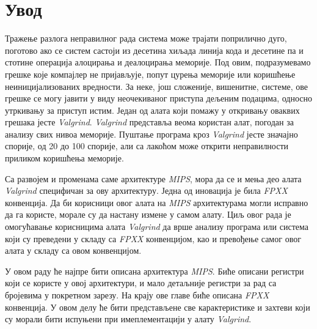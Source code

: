 \documentclass[12pt,oneside]{memoir}
\begin{document}
\frontmatter
\naslovna
\komisija
\apstrakt
\tableofcontents*

\mainmatter

\chapter{Увод}

\indent Тражење разлога неправилног рада система може трајати поприлично дуго, поготово ако се систем састоји из десетина хиљада линија кода и десетине па и стотине операција алоцирања и деалоцирања меморије. Под овим, подразумевамо грешке које компајлер не пријављује, попут цурења меморије или коришћење неиницијализованих вредности. За неке, још сложеније, вишенитне, системе, ове грешке се могу јавити у виду неочекиваног приступа дељеним подацима, односно утркивању за приступ истим. Један од алата који помажу у откривању оваквих грешака јесте \textit{Valgrind}. \textit{Valgrind} представља веома користан алат, погодан за анализу свих нивоа меморије. Пуштање програма кроз \textit{Valgrind} јесте значајно спорије, од 20 до 100 спорије, али са лакоћом може открити неправилности приликом коришћења меморије.

\indent Са развојем и променама саме архитектуре \textit{MIPS}, мора да се и мења део алата \textit{Valgrind} специфичан за ову архитектуру. Једна од иновација је била \textit{FPXX} конвенција. Да би корисници овог алата на \textit{MIPS} архитектурама могли исправно да га користе, морале су да настану измене у самом алату. Циљ овог рада је омогућавање корисницима алата \textit{Valgrind} да врше анализу програма или система који су преведени у складу са \textit{FPXX} конвенцијом, као и превођење самог овог алата у складу са овом конвенцијом.

\indent У овом раду ће најпре бити описана архитектура \textit{MIPS}. Биће описани регистри који се користе у овој архитектури, и мало детаљније регистри за рад са бројевима у покретном зарезу. На крају ове главе биће описана \textit{FPXX} конвенција. У овом делу ће бити представљене све карактеристике и захтеви који су морали бити испуњени при имеплементацији у алату \textit{Valgrind}.
\end{document}
